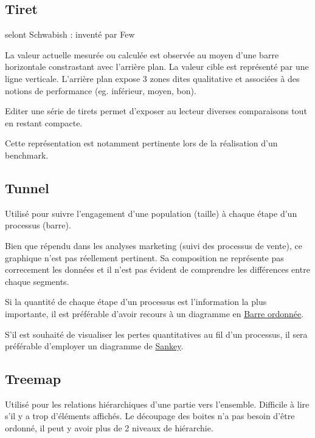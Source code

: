 \documentclass[a4paper,12pt]{article}
\begin{document}
\begin{multicols}{2}
\subsection*{Tiret}
\label{sec:orgfd7bd21}
selont Schwabish : inventé par Few

La valeur actuelle mesurée ou calculée est observée au moyen d'une barre horizontale constrastant avec l'arrière plan. \autocite{jonathanschwabishComparingCategories2021}
La valeur cible est représenté par une ligne verticale. \autocite{alansmithLexiqueVisuel}
L'arrière plan expose 3 zones dites qualitative et associées à des notions de performance (eg. inférieur, moyen, bon). \autocite{sosulskiGraphics2019}

Editer une série de tirets permet d'exposer au lecteur diverses comparaisons tout en restant compacte. \autocite{jonathanschwabishComparingCategories2021}

Cette représentation est notamment pertinente lors de la réalisation d'un benchmark. \autocite{mikeyiHowChooseRight2020}
\subsection*{Tunnel}
\label{sec:org09b4eff}
Utilisé pour suivre l'engagement d'une population (taille) à chaque étape d'un processus (barre). \autocite{mikeyiHowChooseRight2020}

Bien que répendu dans les analyses marketing (suivi des processus de vente), ce graphique n'est pas réellement pertinent. Sa composition ne représente pas correcement les données et il n'est pas évident de comprendre les différences entre chaque segments.\autocite{Few2012p283}

Si la quantité de chaque étape d'un processus est l'information la plus importante, il est préférable d'avoir recours à un diagramme en \hyperref[sec:orgaba5c7a]{Barre ordonnée}.

S'il est  souhaité de visualiser les pertes quantitatives au fil d'un processus, il sera préférable d'employer un diagramme de \hyperref[sec:org7adaa04]{Sankey}.
\subsection*{Treemap}
\label{sec:orgeea6c36}
Utilisé pour les relations hiérarchiques d'une partie vers l'ensemble. Difficile à lire s'il y a trop d'éléments affichés. \autocite{alansmithLexiqueVisuel}
Le découpage des boites n'a pas besoin d'être ordonné, il peut y avoir plus de 2 niveaux de hiérarchie. \autocite{mikeyiHowChooseRight2020}

\end{multicols}
\end{document}
